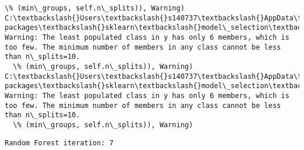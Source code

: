 \documentclass[11pt]{article}
\begin{document}
\begin{Verbatim}[commandchars=\\\{\}]
  \% (min\_groups, self.n\_splits)), Warning)
C:\textbackslash{}Users\textbackslash{}s140737\textbackslash{}AppData\textbackslash{}Local\textbackslash{}Continuum\textbackslash{}anaconda3\textbackslash{}lib\textbackslash{}site-packages\textbackslash{}sklearn\textbackslash{}model\_selection\textbackslash{}\_split.py:605: Warning: The least populated class in y has only 6 members, which is too few. The minimum number of members in any class cannot be less than n\_splits=10.
  \% (min\_groups, self.n\_splits)), Warning)
C:\textbackslash{}Users\textbackslash{}s140737\textbackslash{}AppData\textbackslash{}Local\textbackslash{}Continuum\textbackslash{}anaconda3\textbackslash{}lib\textbackslash{}site-packages\textbackslash{}sklearn\textbackslash{}model\_selection\textbackslash{}\_split.py:605: Warning: The least populated class in y has only 6 members, which is too few. The minimum number of members in any class cannot be less than n\_splits=10.
  \% (min\_groups, self.n\_splits)), Warning)

    \end{Verbatim}

    \begin{Verbatim}[commandchars=\\\{\}]
Random Forest iteration: 7 

    \end{Verbatim}
\end{document}
